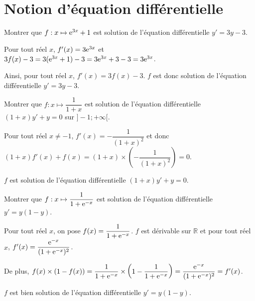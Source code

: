 \documentclass[11pt,fleqn, openany]{book} %
\begin{document}
\section*{Notion d'équation différentielle}

\begin{exercise}Montrer que $f:x \mapsto \mathrm{e}^{3x}+1$ est solution de l'équation différentielle $y'=3y-3$.\end{exercise}

\begin{solution}

Pour tout réel \(x\), \(f'(x)=3\mathrm{e}^{3x}\) et \(3f(x)-3=3(\mathrm{e}^{3x}+1)-3=3\mathrm{e}^{3x}+3-3=3\mathrm{e}^{3x}\).

Ainsi, pour tout réel \(x\), \(f'(x)=3f(x)-3\). \(f\) est donc solution de l'équation différentielle \(y'=3y-3\). \end{solution}



\begin{exercise}Montrer que $f:x\mapsto \dfrac{1}{1+x}$ est solution de l'équation différentielle $(1+x)y'+y=0$ sur $]-1;+\infty[$.\end{exercise}

\begin{solution}

Pour tout réel \(x\neq -1\), \(f'(x)=-\dfrac{1}{(1+x)^2}\) et donc $(1+x)f'(x)+f(x)=(1+x)\times \left(-\dfrac{1}{(1+x)^2}\right)=0$.

\(f\) est solution de l'équation différentielle \((1+x)y'+y=0\).

 \end{solution}
 
 

\begin{exercise}Montrer que $f:x \mapsto \dfrac{1}{1+\mathrm{e}^{-x}}$ est solution de l'équation différentielle $y'=y(1-y)$.\end{exercise}

\begin{solution}

Pour tout réel \(x\), on pose \(f(x)=\dfrac{1}{1+\mathrm{e}^{-x}}\). \(f\) est dérivable sur \(\mathbb{R}\) et pour tout réel \(x\), \(f'(x)=\dfrac{\mathrm{e}^{-x}}{(1+\mathrm{e}^{-x})^2}\). 

De plus, $f(x) \times (1-f(x)) = \dfrac{1}{1+\mathrm{e}^{-x}} \times \left(1-\dfrac{1}{1+\mathrm{e}^{-x}}\right)=\dfrac{\mathrm{e}^{-x}}{(1+\mathrm{e}^{-x})^2}=f'(x)$.

 \(f\) est bien solution de l'équation différentielle \(y'=y(1-y)\).
\end{solution}
\end{document}
